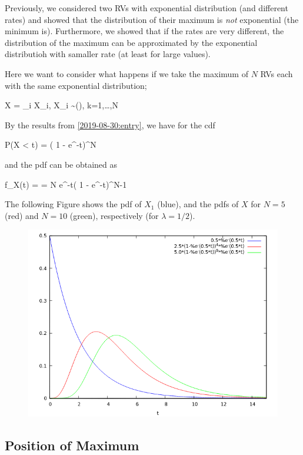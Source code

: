 
Previously, we considered two RVs with exponential distribution (and different rates) and showed that the distribution of their maximum is \emph{not} exponential (the minimum is). Furthermore, we showed that if the rates are very different, the distribution of the maximum can be approximated by the exponential distributioh with samaller rate (at least for large values).

Here we want to consider what happens if we take the maximum of $N$ RVs each with the same exponential distribution; 

\bee
X = \max_i X_i, \quad X_i \sim {}(\lambda), \quad k=1,\ldots,N
\eee

By the results from \ref{2019-08-30:entry}, we have for the cdf

\bee
P(X < t) = \left( 1 - e^{-\lambda t}\right)^N
\eee

and the pdf can be obtained as

\bee
f_X(t) =  = \lambda N e^{-\lambda t}\left( 1 - e^{-\lambda t}\right)^{N-1}
\eee

The following Figure shows the pdf of $X_1$ (blue), and the pdfs of $X$ for $N=5$ (red) and $N=10$ (green), respectively (for $\lambda = 1/2$).

\begin{figure}[hbt!]
\centering
\includegraphics[scale=0.7]{images/exp_pdf_2_1.png}
\end{figure}

\subsection{Position of Maximum}

